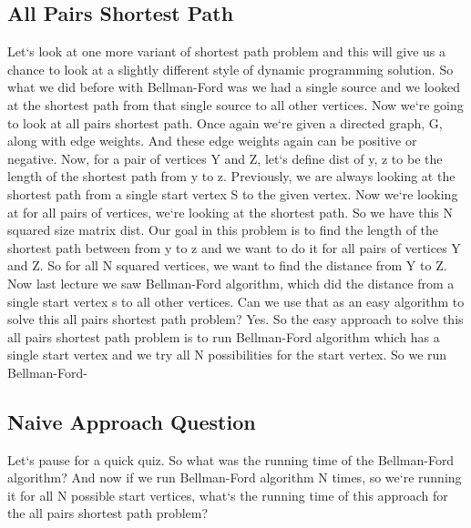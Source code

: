 \subsection{All Pairs Shortest Path}
Let`s look at one more variant of shortest path problem and this will give us a chance to look at a slightly different style of dynamic programming solution.
So what we did before with Bellman-Ford was we had a single source and we looked at the shortest path from that single source to all other vertices.
Now we`re going to look at all pairs shortest path.
Once again we`re given a directed graph, G, along with edge weights.
And these edge weights again can be positive or negative.
Now, for a pair of vertices Y and Z, let`s define dist of y, z to be the length of the shortest path from y to z.
Previously, we are always looking at the shortest path from a single start vertex S to the given vertex.
Now we`re looking at for all pairs of vertices, we`re looking at the shortest path.
So we have this N squared size matrix dist.
Our goal in this problem is to find the length of the shortest path between from y to z and we want to do it for all pairs of vertices Y and Z\@.
So for all N squared vertices, we want to find the distance from Y to Z\@.
Now last lecture we saw Bellman-Ford algorithm, which did the distance from a single start vertex s to all other vertices.
Can we use that as an easy algorithm to solve this all pairs shortest path problem? Yes.
So the easy approach to solve this all pairs shortest path problem is to run Bellman-Ford algorithm which has a single start vertex and we try all N possibilities for the start vertex.
So we run Bellman-Ford-

\subsection{Naive Approach Question}
Let`s pause for a quick quiz.
So what was the running time of the Bellman-Ford algorithm? And now if we run Bellman-Ford algorithm N times, so we`re running it for all N possible start vertices, what`s the running time of this approach for the all pairs shortest path problem?

